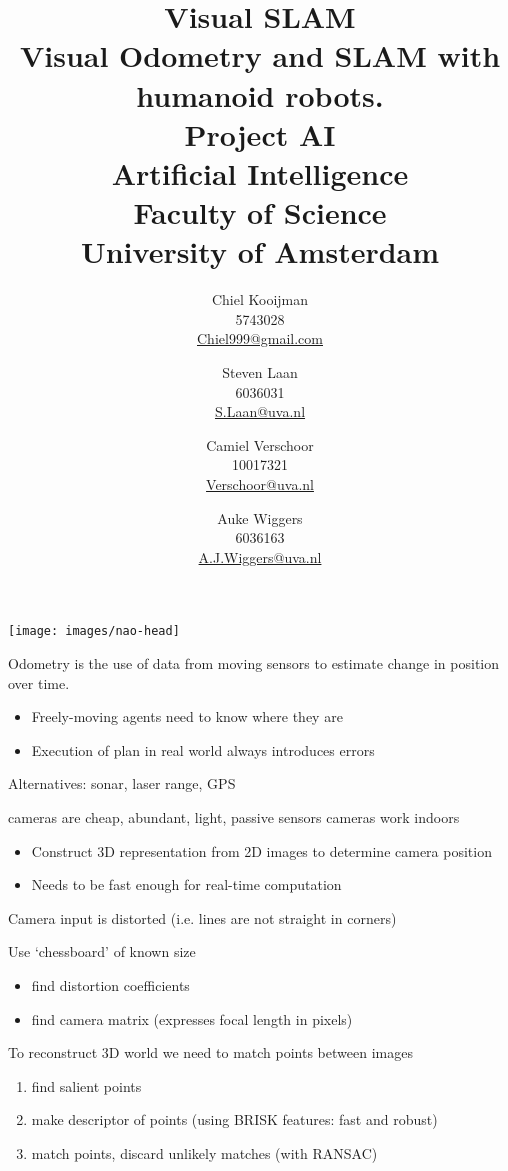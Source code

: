 \documentclass{beamer}
\author{Chiel Kooijman\\5743028\\\url{Chiel999@gmail.com} \and
Steven Laan\\6036031\\\url{S.Laan@uva.nl} \and
Camiel Verschoor\\10017321\\\url{Verschoor@uva.nl} \and
Auke Wiggers\\6036163\\\url{A.J.Wiggers@uva.nl}}
\title{Visual SLAM\\ \normalsize Visual Odometry and SLAM with humanoid
robots.\\Project AI\\Artificial Intelligence\\Faculty of Science\\ University
of Amsterdam}
\begin{document}
\begin{frame}
	\texttt{[image: images/nao-head]}

	Odometry is the use of data from moving sensors to estimate change in
	position over time.
\end{frame}

\begin{frame}
	\begin{itemize}
		\item Freely-moving agents need to know where they are
		\item Execution of plan in real world always introduces errors
	\end{itemize}
\end{frame}

\begin{frame}
	Alternatives: sonar, laser range, GPS

	cameras are cheap, abundant, light, passive sensors
	cameras work indoors
\end{frame}

\begin{frame}
	\begin{itemize}
		\item Construct 3D representation from 2D images to determine camera
			position
		\item Needs to be fast enough for real-time computation
	\end{itemize}
\end{frame}

\begin{frame}[Calibration]
	Camera input is distorted (i.e. lines are not straight in corners)

\end{frame}

\begin{frame}[Calibration]
	Use `chessboard' of known size
	\begin{itemize}
		\item find distortion coefficients
		\item find camera matrix (expresses focal length in pixels)
	\end{itemize}

\end{frame}

\begin{frame}[Descriptors]
	To reconstruct 3D world we need to match points between images
	\begin{enumerate}
		\item find salient points
		\item make descriptor of points (using BRISK features: fast and robust)
		\item match points, discard unlikely matches (with RANSAC)
	\end{enumerate}
\end{frame}
\end{document}

